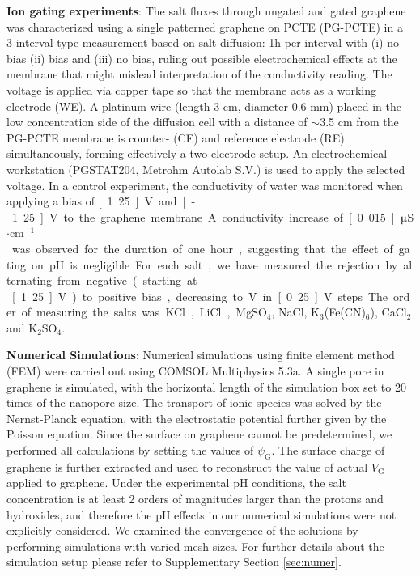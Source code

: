 \documentclass[journal=langd5,email=true, hyperref=true, keywords=false]{achemso}
\begin{document}
\vspace{1em}
\noindent
\textbf{Ion gating experiments}: 
{ The salt fluxes through ungated and gated graphene
was characterized using a single patterned graphene on PCTE (PG-PCTE)} 
in a 3-interval-type measurement based on salt diffusion: 1h per interval
with (i) no bias (ii) bias and (iii) no bias, ruling out possible
electrochemical effects at the membrane that might mislead
interpretation of the conductivity reading. The voltage is applied via
copper tape so that the membrane acts as a working electrode (WE). A
platinum wire (length 3 cm, diameter 0.6 mm) placed in the low
concentration side of the diffusion cell with a distance of $\sim$3.5 cm
from the PG-PCTE membrane is counter- (CE) and reference electrode
(RE) simultaneously, forming effectively a two-electrode setup. An
electrochemical workstation (PGSTAT204, Metrohm Autolab S.V.) is used
to apply the selected voltage.
{ In a control experiment, the conductivity of water was monitored when applying a bias of \unit[1.25]{V} and \unit[-1.25]{V} to the graphene membrane. A conductivity increase of \unit[0.015]{$\muup$S$\cdot$cm$^{-1}$} was observed for the duration of one hour, suggesting that the effect of gating on pH is negligible.

For each salt, we have measured the rejection by alternating from negative (starting at -\unit[1.25]{V}) to positive bias, decreasing to \unit[0]{V} in \unit[0.25]{V} steps. The order of measuring the salts was KCl, LiCl, MgSO$_4$, NaCl, K$_3$(Fe(CN)$_6$), CaCl$_2$ and K$_2$SO$_4$.} 

\vspace{1em}
\noindent
\textbf{Numerical Simulations}: Numerical simulations using finite
element method (FEM) were carried out using COMSOL Multiphysics
5.3a. A single pore in graphene is simulated, with the horizontal
length of the simulation box set to 20 times of the nanopore size. The
transport of ionic species was solved by the Nernst-Planck equation,
with the electrostatic potential further given by the Poisson
equation. Since the surface on graphene cannot be predetermined, we
performed all calculations by setting the values of
$\psi_{\mathrm{G}}$. The surface charge of graphene is further
extracted and used to reconstruct the value of actual $V_{\mathrm{G}}$
applied to graphene. 
{
Under the experimental pH conditions, the salt concentration is at least 2 orders of magnitudes larger than the protons and hydroxides, and therefore the pH effects in our numerical simulations were not explicitly considered.
}
We examined the convergence of the solutions by
performing simulations with varied mesh sizes. For further details
about the simulation setup please refer to Supplementary Section
\ref{sec:numer}.
\end{document}
